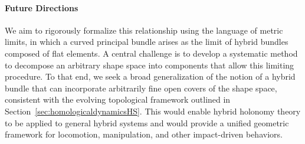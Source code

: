 \documentclass[letterpaper,11pt]{article}
\begin{document}
\paragraph{Future Directions}

We aim to rigorously formalize this relationship using the language of metric limits, in which a curved principal bundle arises as the limit of hybrid bundles composed of flat elements. 
A central challenge is to develop a systematic method to decompose an arbitrary shape space into components that allow this limiting procedure. 
To that end, we seek a broad generalization of the notion of a hybrid bundle that can incorporate arbitrarily fine open covers of the shape space, consistent with the evolving topological framework outlined in Section~\ref{sec:homologicaldynamicsHS}.
This would enable hybrid holonomy theory to be applied to general hybrid systems and would provide a unified geometric framework for locomotion, manipulation, and other impact-driven behaviors.




\end{document}
